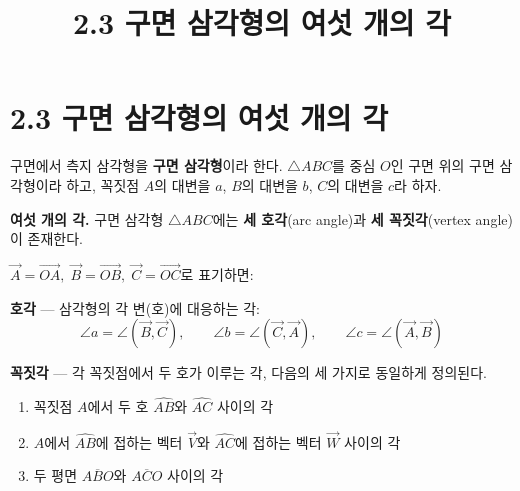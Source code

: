 \documentclass{article}
\title{2.3 구면 삼각형의 여섯 개의 각}
\date{}
\author{}
\begin{document}
\maketitle

\section*{2.3 구면 삼각형의 여섯 개의 각}

구면에서 측지 삼각형을 \textbf{구면 삼각형}이라 한다.
$\triangle ABC$를 중심 $O$인 구면 위의 구면 삼각형이라 하고,
꼭짓점 $A$의 대변을 $a$, $B$의 대변을 $b$, $C$의 대변을 $c$라 하자.

\begin{tcolorbox}[
  colback=teal!4, colframe=teal!65!black,
  title=정의 \& 핵심 규칙,
  fonttitle=\bfseries, boxrule=0.5mm, arc=3mm]

\textbf{\textcolor{teal!65!black}{여섯 개의 각.}}\quad
구면 삼각형 $\triangle ABC$에는 \textbf{세 호각}(arc angle)과 \textbf{세 꼭짓각}(vertex angle)이 존재한다.

\medskip
$\vec{A} = \overrightarrow{OA},\;\vec{B} = \overrightarrow{OB},\;\vec{C} = \overrightarrow{OC}$로 표기하면:

\textbf{호각} --- 삼각형의 각 변(호)에 대응하는 각:
\[
  \angle a = \angle(\vec{B},\vec{C}),\qquad
  \angle b = \angle(\vec{C},\vec{A}),\qquad
  \angle c = \angle(\vec{A},\vec{B})
\]

\textbf{꼭짓각} --- 각 꼭짓점에서 두 호가 이루는 각, 다음의 세 가지로 동일하게 정의된다.
\begin{enumerate}\setlength\itemsep{1pt}
  \item 꼭짓점 $A$에서 두 호 $\widehat{AB}$와 $\widehat{AC}$ 사이의 각
  \item $A$에서 $\widehat{AB}$에 접하는 벡터 $\vec{V}$와 $\widehat{AC}$에 접하는 벡터 $\vec{W}$ 사이의 각
  \item 두 평면 $\overline{ABO}$와 $\overline{ACO}$ 사이의 각
\end{enumerate}

\end{tcolorbox}
\end{document}
